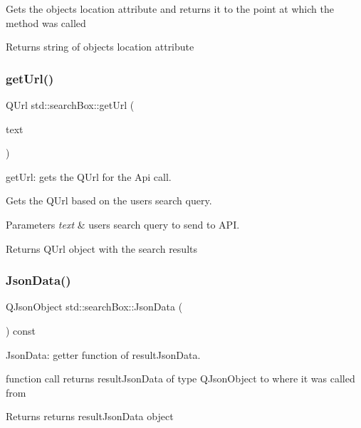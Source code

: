 Gets the objects location attribute and returns it to the point at which the method was called \begin{DoxyReturn}{Returns}
string of objects location attribute 
\end{DoxyReturn}
\mbox{\label{classstd_1_1searchBox_add3510cfd6c74e6978f413c271de176f}} 
\subsubsection{\texorpdfstring{get\+Url()}{getUrl()}}
{\footnotesize\ttfamily Q\+Url std\+::search\+Box\+::get\+Url (\begin{DoxyParamCaption}\item[{Q\+String}]{text }\end{DoxyParamCaption})}



get\+Url\+: gets the Q\+Url for the Api call. 

Gets the Q\+Url based on the users search query. 
\begin{DoxyParams}{Parameters}
{\em text} & users search query to send to A\+PI. \\
\hline
\end{DoxyParams}
\begin{DoxyReturn}{Returns}
Q\+Url object with the search results 
\end{DoxyReturn}
\mbox{\label{classstd_1_1searchBox_a53faa5ee17f5190b1b81ac36b44e9ad2}} 
\subsubsection{\texorpdfstring{Json\+Data()}{JsonData()}}
{\footnotesize\ttfamily Q\+Json\+Object std\+::search\+Box\+::\+Json\+Data (\begin{DoxyParamCaption}{ }\end{DoxyParamCaption}) const}



Json\+Data\+: getter function of result\+Json\+Data. 

function call returns result\+Json\+Data of type Q\+Json\+Object to where it was called from \begin{DoxyReturn}{Returns}
returns result\+Json\+Data object 
\end{DoxyReturn}
\mbox{\label{classstd_1_1searchBox_abaa8a631bd23679e319a7290c703edac}} 

